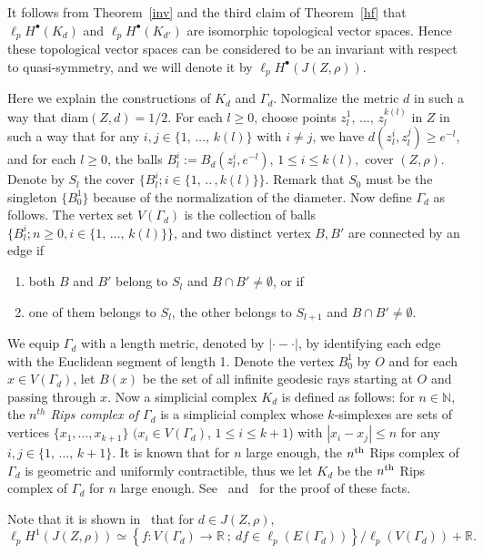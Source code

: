 \documentclass[AHL,Unicode,longabstracts,published]{cedram}
\newcommand{\br}{\mathbb{R}}
\newcommand{\bn}{\mathbb{N}}
\begin{document}
It follows from Theorem~\ref{inv} and the third claim of Theorem~\ref{hf} that $\ell_pH^{\bullet}(K_d)$ and
$\ell_pH^{\bullet}(K_{d'})$ are isomorphic topological vector spaces. Hence these topological vector spaces can be considered to be an invariant with respect to quasi-symmetry, and we will denote it by $\ell_pH^{\bullet}(J(Z,\rho))$.


Here we explain the constructions of $K_{d}$ and $\Gamma_{d}$. Normalize the metric $d$ in such a way that diam$(Z,d)=1/2$. For each $l\geq0$, choose points $z^1_l,\,\dots,\,z^{k(l)}_l$ in $Z$ in such a way that for any $i,j\in\{1,\,\dots,\,k(l)\}$ with $i\neq j$, we have $d(z_l^i,z_l^j)\geq e^{-l}$, and for each $l\geq0$, the balls $B_l^i:=B_{d}(z_l^i,e^{-l})$, $1\leq i\leq k(l),$ cover $(Z,\rho)$. Denote by $S_l$ the cover $\{B_l^i;i\in\{1,\,..\,,k(l)\}\}$. Remark that $S_0$ must be the singleton $\{B_0^1\}$ because of the normalization of the diameter. Now define $\Gamma_{d}$ as follows. The vertex set $V(\Gamma_{d})$ is the collection of balls $
\{B_l^i;n\geq0,i\in\{1,\,\dots,\,k(l)\}\}$, and two distinct vertex $B,B'$ are connected by an edge if
\begin{enumerate}
\item both $B$ and $B'$ belong to $S_l$ and $B\cap B'\neq\emptyset$, or if
\item one of them belongs to $S_l$, the other belongs to $S_{l+1}$ and $B\cap B'\neq\emptyset$.
\end{enumerate}
We equip $\Gamma_{d}$ with a length metric, denoted by $|\cdot-\cdot|$, by identifying each edge with the Euclidean segment of length 1. Denote the vertex $B_0^1$ by $O$ and for each $x\in V(\Gamma_{d})$, let $B(x)$ be the set of all infinite geodesic rays starting at $O$ and passing through $x$. Now a simplicial complex $K_{d}$ is defined as follows: for $n\in\bn$, the \emph{$n^{th}$ Rips complex of $\Gamma_{d}$} is a simplicial complex whose $k$-simplexes are sets of vertices $\{x_1,\dots,x_{k+1}\}$ $(x_i\in V(\Gamma_{d})$, $1\leq i\leq k+1$) with $|x_i-x_j|\leq n$ for any $i,j\in\{1,\,\dots,\,k+1\}$. It is known that for $n$ large enough, the $n^{\rm th}$ Rips complex of $\Gamma_{d}$ is geometric and uniformly contractible, thus we let $K_{d}$ be the $n^{\rm th}$ Rips complex of $\Gamma_{d}$ for $n$ large enough. See~\cite[Section~3]{BH} and~\cite{BP} for the proof of these facts.

Note that it is shown in~\cite{BP} that for $d\in J(Z,\rho)$,
\begin{equation}\label{coho}
\ell_pH^{1}(J(Z,\rho))\simeq
\left\{f:V(\Gamma_{d})\rightarrow\br\ ;\ df\in\ell_p(E(\Gamma_{d}))\right\}/\ell_p(V(\Gamma_{d}))+\br.
\end{equation}
\end{document}
